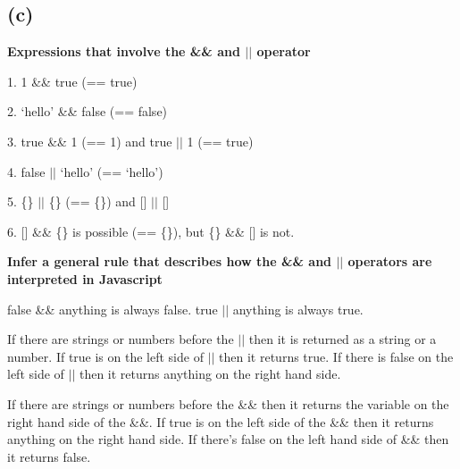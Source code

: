 \documentclass[11pt, oneside]{article}
\newcommand{\forceindent}{\leavevmode{\parindent=1.5em\indent}}
\begin{document}
\subsection*{(c)}
\forceindent \par \textbf{Expressions that involve the \&\& and $||$ operator}
\par 1. 1 \&\& true (== true)
\par 2. `hello' \&\& false (== false)
\par 3. true \&\& 1 (== 1) and true $||$ 1 (== true)
\par 4. false $||$ `hello' (== `hello')
\par 5. \{\} $||$ \{\} (== \{\}) and [] $||$ []
\par 6. [] \&\& \{\} is possible (== \{\}), but \{\} \&\& [] is not.
\par \textbf{Infer a general rule that describes how the \&\& and $||$ operators are interpreted in Javascript}
\par false \&\& anything is always false. true $||$ anything is always true. 
\par If there are strings or numbers before the $||$ then it is returned as a string or a number. If true is on the left side of $||$ then it returns true. If there is false on the left side of $||$ then it returns anything on the right hand side.
\par If there are strings or numbers before the \&\& then it returns the variable on the right hand side of the \&\&. If true is on the left side of the \&\& then it returns anything on the right hand side. If there's false on the left hand side of \&\& then it returns false.
\end{document}
